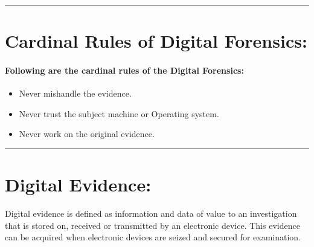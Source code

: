 \documentclass[british]{article}
\begin{document}
\rule[0.5ex]{0.75\columnwidth}{1pt}

\section{Cardinal Rules of Digital Forensics:}

\paragraph{Following are the cardinal rules of the Digital Forensics:}
\begin{itemize}
\item Never mishandle the evidence.
\item Never trust the subject machine or Operating system.
\item Never work on the original evidence.
\end{itemize}
\rule[0.5ex]{0.75\columnwidth}{1pt}

\section{Digital Evidence:}

Digital evidence is defined as information and data of value to an
investigation that is stored on, received or transmitted by an electronic
device. This evidence can be acquired when electronic devices are
seized and secured for examination.
\end{document}
